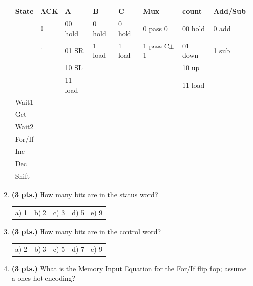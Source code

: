 \documentclass{article}
\begin{document}
\begin{enumerate}
\begin{tabular}{|l||l|l|l|l|l|l|l|}  \hline
State & ACK & A       & B      & C      & Mux        & count   & Add/Sub \\ \hline
      & 0   & 00 hold & 0 hold & 0 hold & 0 pass 0   & 00 hold & 0 add \\ \hline
      & 1   & 01 SR   & 1 load & 1 load & 1 pass C$\pm$1 & 01 down & 1 sub \\ \hline
      &     & 10 SL   &        &        &            & 10 up   &       \\ \hline
      &     & 11 load &        &        &            & 11 load &       \\ \hline   \hline
Wait1 & \x  &         &        &        &            &         &       \\ \hline
Get   & \x  &  \x     &  \x    &  \x    &  \x        &  \x     & \x    \\ \hline
Wait2 & \x  &  \x     &        &        &  \x        &  \x     &       \\ \hline
For/If &    &         &        &        &            &         &       \\ \hline
Inc   &     &  \x     &        &  \x    &  \x        &         & \x    \\ \hline
Dec   & \x  &         &        &  \x    &  \x        &         & \x    \\ \hline
Shift &     &  \x     &  \x    &  \x    &  \x        &         & \x    \\ \hline
\end{tabular}

\pagebreak
\item{\bf (3 pts.)} How many bits are in the status word?

\begin{tabular}{p{0.75in}p{0.75in}p{0.75in}p{0.75in}p{0.75in}}
a) 1 & b) 2 & c) 3 & d) 5 & e) 9 \\
\end{tabular}

\item{\bf (3 pts.)} How many bits are in the control word?

\begin{tabular}{p{0.75in}p{0.75in}p{0.75in}p{0.75in}p{0.75in}}
a) 2 & b) 3 & c) 5 & d) 7 & e) 9 \\
\end{tabular}

\item{\bf (3 pts.)} What is the Memory Input Equation for the For/If
flip flop; assume a ones-hot encoding?


\end{enumerate}
\end{document}
